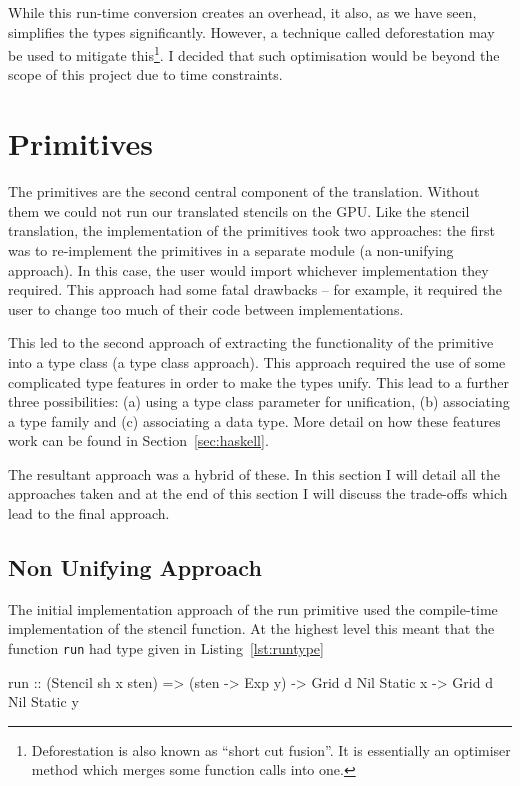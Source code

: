 \documentclass[12pt,a4paper,twoside]{scrbook}
\begin{document}
While this run-time conversion creates an overhead, it also, as we have
seen, simplifies the types significantly. However, a technique called
deforestation may be used to mitigate this\footnote{Deforestation is also known
  as ``short cut fusion''. It is essentially an optimiser method which merges
  some function calls into one.}. I decided that such optimisation would be
beyond the scope of this project due to time constraints.

\section{Primitives}
\label{sec:prims}

The primitives are the second central component of the translation.  Without
them we could not run our translated stencils on the GPU. Like the stencil
translation, the implementation of the primitives took two approaches: the first
was to re-implement the primitives in a separate module (a non-unifying
approach). In this case, the user would import whichever implementation they
required. This approach had some fatal drawbacks -- for example, it required the
user to change too much of their code between implementations.

This led to the second approach of extracting the functionality of the primitive
into a type class (a type class approach). This approach required the use of
some complicated type features in order to make the types unify. This lead to a
further three possibilities: (a) using a type class parameter for unification,
(b) associating a type family and (c) associating a data type. More detail on
how these features work can be found in Section~\ref{sec:haskell}.

The resultant approach was a hybrid of these. In this section I will detail all
the approaches taken and at the end of this section I will discuss the
trade-offs which lead to the final approach.

\subsection{Non Unifying Approach}

The initial implementation approach of the run primitive used the compile-time
implementation of the stencil function. At the highest level this meant that the
function \texttt{run} had type given in Listing~\ref{lst:runtype}

\begin{hflisting}[label={lst:runtype}, caption=The type of run required by Accelerate.]
run :: (Stencil sh x sten) =>
       (sten -> Exp y) -> Grid d Nil Static x -> Grid d Nil Static y
\end{hflisting}
\end{document}
